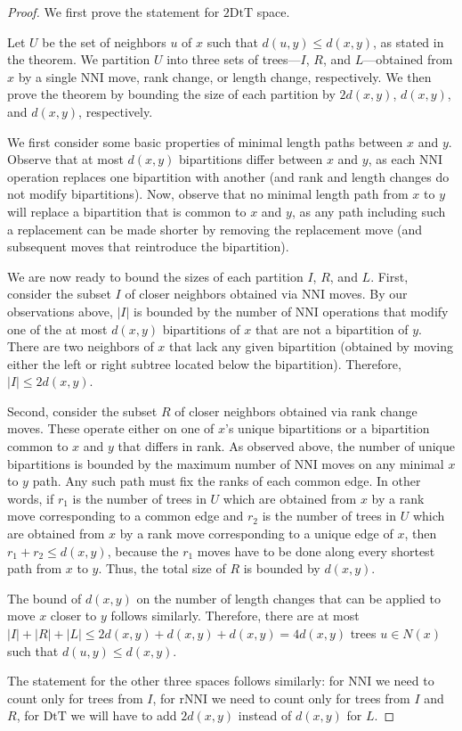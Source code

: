\documentclass{amsart}
\theoremstyle{definition}
\newcommand{\dts}{\mathrm{2DtT}}
\newcommand{\nni}{\mathrm{NNI}}
\newcommand{\rnni}{\mathrm{rNNI}}
\newcommand{\mdts}{\mathrm{DtT}}
\begin{document}
\begin{proof}
We first prove the statement for $\dts$ space.

Let $U$ be the set of neighbors $u$ of $x$ such that $d(u,y) \le d(x,y)$, as stated in the theorem.
We partition $U$ into three sets of trees---$I$, $R$, and $L$---obtained from $x$ by a single NNI move, rank change, or length change, respectively.
We then prove the theorem by bounding the size of each partition by $2d(x,y)$, $d(x,y)$, and $d(x,y)$, respectively.

We first consider some basic properties of minimal length paths between $x$ and $y$.
Observe that at most $d(x,y)$ bipartitions differ between $x$ and $y$, as each NNI operation replaces one bipartition with another (and rank and length changes do not modify bipartitions).
Now, observe that no minimal length path from $x$ to $y$ will replace a bipartition that is common to $x$ and $y$, as any path including such a replacement can be made shorter by removing the replacement move (and subsequent moves that reintroduce the bipartition).

We are now ready to bound the sizes of each partition $I$, $R$, and $L$.
First, consider the subset $I$ of closer neighbors obtained via NNI moves.
By our observations above, $|I|$ is bounded by the number of NNI operations that modify one of the at most $d(x,y)$ bipartitions of $x$ that are not a bipartition of $y$.
There are two neighbors of $x$ that lack any given bipartition (obtained by moving either the left or right subtree located below the bipartition).
Therefore, $|I| \le 2d(x,y)$.

Second, consider the subset $R$ of closer neighbors obtained via rank change moves.
These operate either on one of $x$'s unique bipartitions or a bipartition common to $x$ and $y$ that differs in rank.
As observed above, the number of unique bipartitions is bounded by the maximum number of NNI moves on any minimal $x$ to $y$ path.
Any such path must fix the ranks of each common edge.
In other words, if $r_1$ is the number of trees in $U$ which are obtained from $x$ by a rank move corresponding to a common edge and $r_2$ is the number of trees in $U$ which are obtained from $x$ by a rank move corresponding to a unique edge of $x$, then $r_1 + r_2 \leq d(x,y)$, because the $r_1$ moves have to be done along every shortest path from $x$ to $y$.
Thus, the total size of $R$ is bounded by $d(x,y)$.

The bound of $d(x,y)$ on the number of length changes that can be applied to move $x$ closer to $y$ follows similarly.
Therefore, there are at most $|I| + |R| + |L| \le 2d(x,y) + d(x,y) + d(x,y) = 4d(x,y)$ trees $u \in N(x)$ such that $d(u, y) \le d(x, y)$.

The statement for the other three spaces follows similarly: for $\nni$ we need to count only for trees from $I$, for $\rnni$ we need to count only for trees from $I$ and $R$, for $\mdts$ we will have to add $2d(x,y)$ instead of $d(x,y)$ for $L$.
\end{proof}
\end{document}
